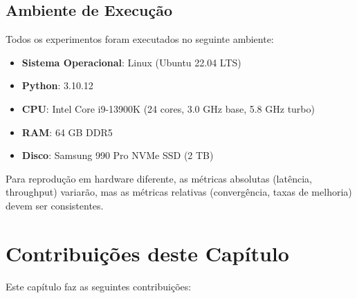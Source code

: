 \subsection{Ambiente de Execução}

Todos os experimentos foram executados no seguinte ambiente:

\begin{itemize}
    \item \textbf{Sistema Operacional}: Linux (Ubuntu 22.04 LTS)
    \item \textbf{Python}: 3.10.12
    \item \textbf{CPU}: Intel Core i9-13900K (24 cores, 3.0 GHz base, 5.8 GHz turbo)
    \item \textbf{RAM}: 64 GB DDR5
    \item \textbf{Disco}: Samsung 990 Pro NVMe SSD (2 TB)
\end{itemize}

Para reprodução em hardware diferente, as métricas absolutas (latência, throughput) variarão, mas as métricas relativas (convergência, taxas de melhoria) devem ser consistentes.

\section{Contribuições deste Capítulo}
\label{sec:contributions}

Este capítulo faz as seguintes contribuições:

